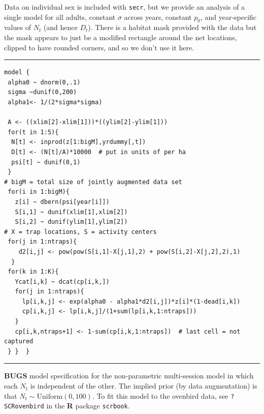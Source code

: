 Data on individual sex is included
with \mbox{\tt secr}, but  we provide an analysis of a single model
for all adults, constant $\sigma$ across years, constant $p_{0}$, and
year-specific values of $N_{t}$ (and hence $D_{t}$).
 There is a habitat mask provided with the data but the mask
appears to just be a modified rectangle around the net locations,
clipped to have rounded corners, and so we don't use it here.






\begin{panel}[htp]
\centering
\rule[0.15in]{\textwidth}{.03in}
{\small
\begin{verbatim}
model {
 alpha0 ~ dnorm(0,.1)
 sigma ~dunif(0,200)
 alpha1<- 1/(2*sigma*sigma)

 A <- ((xlim[2]-xlim[1]))*((ylim[2]-ylim[1]))
 for(t in 1:5){
  N[t] <- inprod(z[1:bigM],yrdummy[,t])
  D[t] <- (N[t]/A)*10000  # put in units of per ha
  psi[t] ~ dunif(0,1)
 }
# bigM = total size of jointly augmented data set
 for(i in 1:bigM){
   z[i] ~ dbern(psi[year[i]])
   S[i,1] ~ dunif(xlim[1],xlim[2])
   S[i,2] ~ dunif(ylim[1],ylim[2])
# X = trap locations, S = activity centers
 for(j in 1:ntraps){
    d2[i,j] <- pow(pow(S[i,1]-X[j,1],2) + pow(S[i,2]-X[j,2],2),1)
  }
 for(k in 1:K){
   Ycat[i,k] ~ dcat(cp[i,k,])
   for(j in 1:ntraps){
     lp[i,k,j] <- exp(alpha0 - alpha1*d2[i,j])*z[i]*(1-dead[i,k])
     cp[i,k,j] <- lp[i,k,j]/(1+sum(lp[i,k,1:ntraps]))
   }
   cp[i,k,ntraps+1] <- 1-sum(cp[i,k,1:ntraps])  # last cell = not captured
 } }  }
\end{verbatim}
}
\rule[-0.15in]{\textwidth}{.03in}
\caption{
{\bf BUGS} model specification for the non-parametric multi-session
model in which each $N_{t}$ is independent of the other. The implied
prior (by data augmentation) is that $N_{t} \sim
\mbox{Uniform}(0,100)$.
To fit this model to the ovenbird data, see
 \mbox{\tt ?SCRovenbird} in the {\bf R} package \mbox{\tt scrbook}.
}
\label{poisson-mn.panel.ovenbird}
\end{panel}


